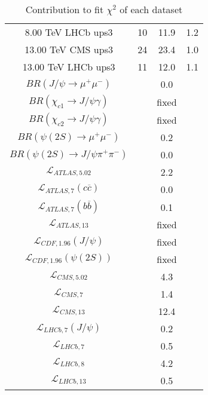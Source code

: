 \begin{table}[h!]
\begin{tabular}{c|c|c|c}
8.00 TeV LHCb ups3 & 10 & 11.9 & 1.2 \\
13.00 TeV CMS ups3 & 24 & 23.4 & 1.0 \\
13.00 TeV LHCb ups3 & 11 & 12.0 & 1.1 \\
\hline
$BR(J/\psi\rightarrow\mu^+\mu^-)$ &  & 0.0 &  \\
$BR(\chi_{c1}\rightarrow J/\psi\gamma)$ &  & fixed & \\
$BR(\chi_{c2}\rightarrow J/\psi\gamma)$ &  & fixed & \\
$BR(\psi(2S)\rightarrow\mu^+\mu^-)$ &  & 0.2 &  \\
$BR(\psi(2S)\rightarrow J/\psi\pi^+\pi^-)$ &  & 0.0 &  \\
$\mathcal L_{ATLAS,5.02}$ &  & 2.2 &  \\
$\mathcal L_{ATLAS,7}(c\overline c)$ &  & 0.0 &  \\
$\mathcal L_{ATLAS,7}(b\overline b)$ &  & 0.1 &  \\
$\mathcal L_{ATLAS,13}$ &  & fixed & \\
$\mathcal L_{CDF,1.96}(J/\psi)$ &  & fixed & \\
$\mathcal L_{CDF,1.96}(\psi(2S))$ &  & fixed & \\
$\mathcal L_{CMS,5.02}$ &  & 4.3 &  \\
$\mathcal L_{CMS,7}$ &  & 1.4 &  \\
$\mathcal L_{CMS,13}$ &  & 12.4 &  \\
$\mathcal L_{LHCb,7}(J/\psi)$ &  & 0.2 &  \\
$\mathcal L_{LHCb,7}$ &  & 0.5 &  \\
$\mathcal L_{LHCb,8}$ &  & 4.2 &  \\
$\mathcal L_{LHCb,13}$ &  & 0.5 &  \\
\end{tabular}
\caption{Contribution to fit $\chi^2$ of each dataset}
\end{table}
